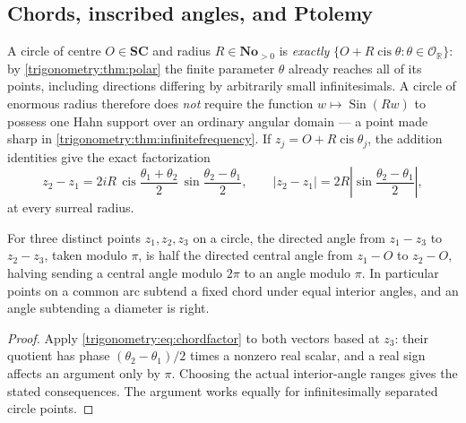 \documentclass[11pt,letterpaper]{article}
\numberwithin{equation}{section}
\theoremstyle{definition}
\theoremstyle{remark}
\newcommand{\No}{\mathbf{No}}
\newcommand{\SC}{\mathbf{SC}}
\newcommand{\R}{\mathbb R}
\newcommand{\OO}{\mathcal O}
\newcommand{\cis}{\operatorname{cis}}
\newcommand{\Sin}{\operatorname{Sin}}
\begin{document}
\subsection{Chords, inscribed angles, and Ptolemy}
A circle of centre $O\in\SC$ and radius $R\in\No_{>0}$ is \emph{exactly}
$\{O+R\cis\theta:\theta\in\OO_{\R}\}$: by \cref{trigonometry:thm:polar} the finite parameter
$\theta$ already reaches all of its points, including directions differing by arbitrarily small
infinitesimals. A circle of enormous radius therefore does \emph{not} require the function
$w\mapsto\Sin(Rw)$ to possess one Hahn support over an ordinary angular domain --- a point made
sharp in \cref{trigonometry:thm:infinitefrequency}. If $z_j=O+R\cis\theta_j$, the addition
identities give the exact factorization
\begin{equation}\label{trigonometry:eq:chordfactor}
 z_2-z_1=2iR\,\cis\frac{\theta_1+\theta_2}2\,\sin\frac{\theta_2-\theta_1}2,
 \qquad
 |z_2-z_1|=2R\left|\sin\frac{\theta_2-\theta_1}2\right|,
\end{equation}
at every surreal radius.

\begin{proposition}\label{trigonometry:prop:inscribed}
For three distinct points $z_1,z_2,z_3$ on a circle, the directed angle from $z_1-z_3$ to
$z_2-z_3$, taken modulo $\pi$, is half the directed central angle from $z_1-O$ to $z_2-O$, halving
sending a central angle modulo $2\pi$ to an angle modulo $\pi$. In particular points on a common
arc subtend a fixed chord under equal interior angles, and an angle subtending a diameter is right.
\end{proposition}
\begin{proof}
Apply \cref{trigonometry:eq:chordfactor} to both vectors based at $z_3$: their quotient has phase
$(\theta_2-\theta_1)/2$ times a nonzero real scalar, and a real sign affects an argument only by
$\pi$. Choosing the actual interior-angle ranges gives the stated consequences. The argument works
equally for infinitesimally separated circle points.
\end{proof}
\end{document}
